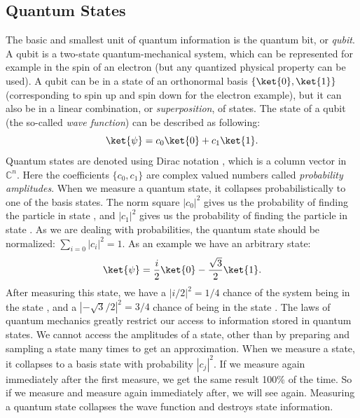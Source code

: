 \documentclass[a4paper,10pt]{article}
\begin{document}
\subsection{Quantum States}
The basic and smallest unit of quantum information is the quantum bit, or \emph{qubit}.
A qubit is a two-state quantum-mechanical system, which can be represented for example in the spin of an electron (but any quantized physical property can be used).
A qubit can be in a state of an orthonormal basis $\{\ket{0}, \ket{1}\}$ (corresponding to spin up and spin down for the electron example), but it can also be in a linear combination, or \emph{superposition}, of states.
The state of a qubit (the so-called \emph{wave function}) can be described as following:
\begin{equation}
\ket{\psi} = c_0\ket{0} + c_1\ket{1}.
\end{equation}
Quantum states are denoted using Dirac notation \ket{\cdotp}, which is a column vector in $\mathbb{C}^n$.
Here the coefficients $\{c_0, c_1\}$ are complex valued numbers called \emph{probability amplitudes}.
When we measure a quantum state, it collapses probabilistically to one of the basis states.
The norm square $|c_0|^2$ gives us the probability of finding the particle in state , and $|c_1|^2$ gives us the probability of finding the particle in state .
As we are dealing with probabilities, the quantum state should be normalized: $\sum_{i=0}|c_i|^2 = 1$.
As an example we have an arbitrary state:
\begin{equation}
\ket{\psi} = \dfrac{i}{2}\ket{0} - \dfrac{\sqrt3}{2}\ket{1}.
\end{equation}
After measuring this state, we have a $|i/2|^2 = 1/4$ chance of the system being in the state , and a $|{-}\sqrt3/2|^2 = 3/4$ chance of being in the state .
The laws of quantum mechanics greatly restrict our access to information stored in quantum states.
We cannot access the amplitudes of a state, other than by preparing and sampling a state many times to get an approximation. 
When we measure a state, it collapses to a basis state  with probability $|c_j|^2$.
If we measure again immediately after the first measure, we get the same result 100\% of the time.
So if we measure  and measure again immediately after, we will see  again.
Measuring a quantum state collapses the wave function and destroys state information.
\end{document}
